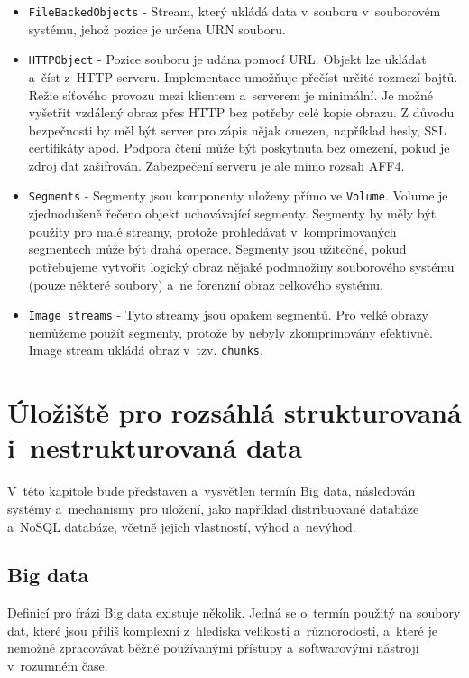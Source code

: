 \begin{itemize}
\item \texttt{FileBackedObjects} - Stream, který ukládá data v~souboru v~souborovém systému, jehož pozice je určena URN souboru.

\item \texttt{HTTPObject} - Pozice souboru je udána pomocí URL. Objekt lze ukládat a~číst z~HTTP serveru. Implementace umožňuje přečíst určité rozmezí bajtů. Režie síťového provozu mezi klientem a~serverem je minimální. Je možné vyšetřit vzdálený obraz přes HTTP bez potřeby celé kopie obrazu. Z důvodu bezpečnosti by měl být server pro zápis nějak omezen, například hesly, SSL certifikáty apod. Podpora čtení může být poskytnuta bez omezení, pokud je zdroj dat zašifrován. Zabezpečení serveru je ale mimo rozsah AFF4.

\item \texttt{Segments} - Segmenty jsou komponenty uloženy přímo ve \texttt{Volume}. Volume je zjednodušeně řečeno objekt uchovávající segmenty. Segmenty by měly být použity pro malé streamy, protože prohledávat v~komprimovaných segmentech může být drahá operace. Segmenty jsou užitečné, pokud potřebujeme vytvořit logický obraz nějaké podmnožiny souborového systému (pouze některé soubory) a~ne forenzní obraz celkového systému.

\item \texttt{Image streams} - Tyto streamy jsou opakem segmentů. Pro velké obrazy nemůžeme použít segmenty, protože by nebyly zkomprimovány efektivně. Image stream ukládá obraz v~tzv. \texttt{chunks}.
\end{itemize}

\chapter{Úložiště pro rozsáhlá strukturovaná i~nestrukturovaná data} \label{chapter2}
V~této kapitole bude představen a~vysvětlen termín Big data, následován systémy a~mechanismy pro uložení, jako například distribuované databáze a~NoSQL databáze, včetně jejich vlastností, výhod a~nevýhod.

\section{Big data} \label{bigDataSection}
Definicí pro frázi Big data existuje několik. Jedná se o~termín použitý na soubory dat, které jsou příliš komplexní z~hlediska velikosti a~různorodosti, a~které je nemožné zpracovávat běžně používanými přístupy a~softwarovými nástroji v~rozumném čase.


